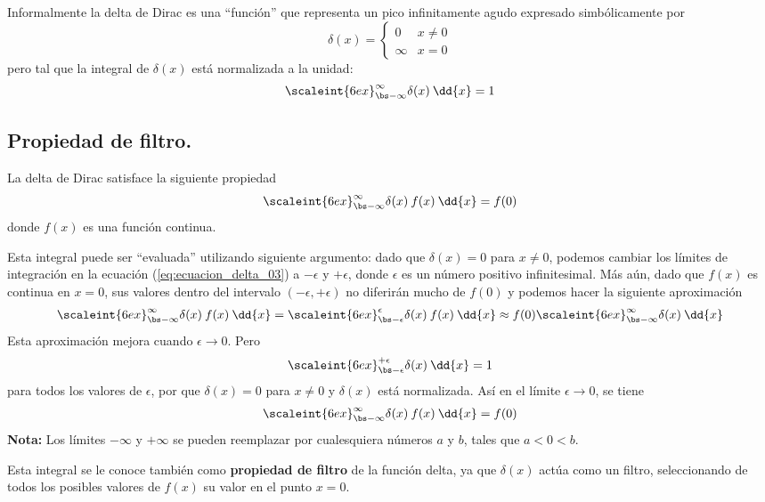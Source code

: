 Informalmente la delta de Dirac es una \enquote{función} que representa un pico infinitamente agudo expresado simbólicamente por
\begin{equation}
\delta (x) = \begin{cases}
0 & x \neq 0 \\
\infty & x = 0
\end{cases}
\label{eq:ecuacion_delta_01}
\end{equation}
pero tal que la integral de $\delta (x)$ está normalizada a la unidad:
\begin{equation}
\scaleint{6ex}_{\bs -\infty}^{\infty} \delta (x) \: \dd{x} = 1 
\label{eq:ecuacion_delta_02}
\end{equation}

\subsection{Propiedad de filtro.}

La delta de Dirac satisface la siguiente propiedad
\begin{equation}
\scaleint{6ex}_{\bs -\infty}^{\infty} \delta (x) \: f (x) \: \dd{x} = f (0)
\label{eq:ecuacion_delta_03}
\end{equation}
donde $f (x)$ es una función continua.
\par
Esta integral puede ser \enquote{evaluada} utilizando siguiente argumento: dado que $\delta (x) = 0$ para $x \neq 0$, podemos cambiar los límites de integración en la ecuación (\ref{eq:ecuacion_delta_03}) a $- \epsilon$ y $+ \epsilon$, donde $\epsilon$ es un número positivo infinitesimal. Más aún, dado que $ f (x)$ es continua en $x = 0$, sus valores dentro del intervalo $( - \epsilon, + \epsilon)$ no diferirán mucho de $f (0)$ y podemos hacer la siguiente aproximación
\begin{align*}
\scaleint{6ex}_{\bs -\infty}^{\infty} \delta (x) \: f (x) \: \dd{x} = \scaleint{6ex}_{\bs -\epsilon}^{\epsilon} \delta (x) \: f (x) \: \dd{x} \approx f (0) \scaleint{6ex}_{\bs -\infty}^{\infty} \delta (x) \: \dd{x}
\end{align*}
Esta aproximación mejora cuando $\epsilon \to 0$. Pero
\begin{align*}
\scaleint{6ex}_{\bs -\epsilon}^{+\epsilon} \delta (x) \: \dd{x} = 1
\end{align*}
para todos los valores de $\epsilon$, por que $\delta (x) = 0$ para $x \neq 0$ y $\delta (x)$ está normalizada. Así en el límite $\epsilon \to 0$, se tiene
\begin{align*}
\scaleint{6ex}_{\bs -\infty}^{\infty} \delta (x) \: f (x) \: \dd{x} = f (0)
\end{align*}
\textbf{Nota: } Los límites $-\infty$ y $+\infty$ se pueden reemplazar por cualesquiera números $a$ y $b$, tales que $a < 0 < b$.
\par
Esta integral se le conoce también como \textbf{propiedad de filtro} de la función delta, ya que $\delta (x)$ actúa como un filtro, seleccionando de todos los posibles valores de $f (x)$ su valor en el punto $x = 0$.

